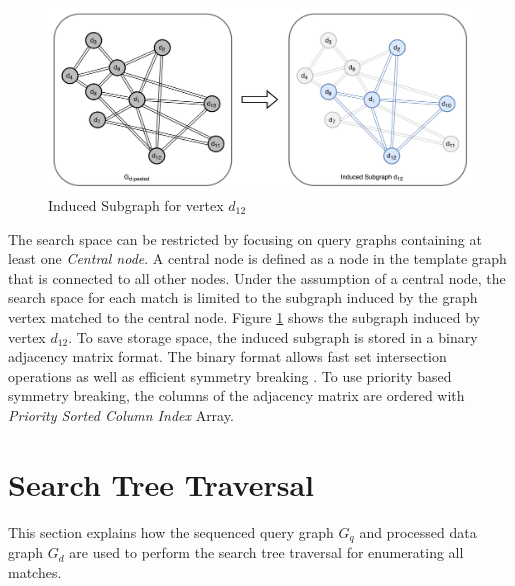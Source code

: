 \begin{figure}
    \includegraphics[width=\textwidth]{fig/LR/Induced-subgraph.png}
    \caption{Induced Subgraph for vertex $d_{12}$}
    \label{fig:induced-subgraph}
\end{figure}

The search space can be restricted by focusing on query graphs containing at least one \textit{Central node}.
A central node is defined as a node in the template graph that is connected to all other nodes.
Under the assumption of a central node, the search space for each match is limited to the subgraph induced by the graph vertex matched to the central node.
Figure \ref{fig:induced-subgraph} shows the subgraph induced by vertex $d_{12}$.
To save storage space, the induced subgraph is stored in a binary adjacency matrix format.
The binary format allows fast set intersection operations as well as efficient symmetry breaking \cite{mohammad_K-clique}.
To use priority based symmetry breaking, the columns of the adjacency matrix are ordered with \textit{Priority Sorted Column Index} Array.

\section{Search Tree Traversal}\label{DFS-T}
This section explains how the sequenced query graph $G_q$ and processed data graph $G_d$ are used to perform the search tree traversal for enumerating all matches.

